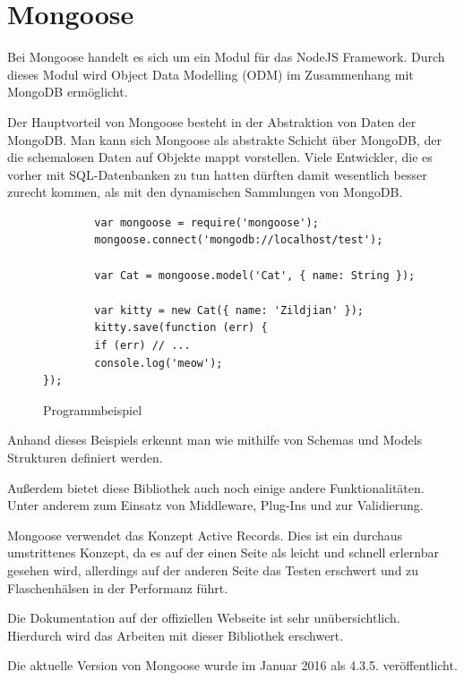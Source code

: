 \section{Mongoose}\label{mongoose}

Bei Mongoose handelt es sich um ein Modul für das NodeJS Framework.
Durch dieses Modul wird Object Data Modelling (ODM) im Zusammenhang mit MongoDB ermöglicht.

Der Hauptvorteil von Mongoose besteht in der Abstraktion von Daten der MongoDB.
Man kann sich Mongoose als abstrakte Schicht über MongoDB, der die schemalosen Daten auf Objekte mappt vorstellen.
Viele Entwickler, die es vorher mit SQL-Datenbanken zu tun hatten dürften damit wesentlich besser zurecht kommen,
als mit den dynamischen Sammlungen von MongoDB.

\begin{figure}[h]
	\centering
	\begin{lstlisting}
		var mongoose = require('mongoose');
		mongoose.connect('mongodb://localhost/test');

		var Cat = mongoose.model('Cat', { name: String });

		var kitty = new Cat({ name: 'Zildjian' });
		kitty.save(function (err) {
		if (err) // ...
		console.log('meow');
});
	\end{lstlisting}
	\caption[mongooseSchema]{Programmbeispiel}
\end{figure}

\cite{mongoose:bsp}

Anhand dieses Beispiels erkennt man wie mithilfe von Schemas und Models Strukturen definiert werden.

Außerdem bietet diese Bibliothek auch noch einige andere Funktionalitäten. Unter anderem zum Einsatz von Middleware, Plug-Ins und zur Validierung.

Mongoose verwendet das Konzept Active Records. Dies ist ein durchaus umstrittenes Konzept,
da es auf der einen Seite als leicht und schnell erlernbar gesehen wird,
allerdings auf der anderen Seite das Testen erschwert und zu Flaschenhälsen in der Performanz führt. \cite{ormPattern:activeRecord}

Die Dokumentation auf der offiziellen Webseite ist sehr unübersichtlich. Hierdurch wird das Arbeiten mit dieser Bibliothek erschwert.

Die aktuelle Version von Mongoose wurde im Januar 2016 als 4.3.5. veröffentlicht.
